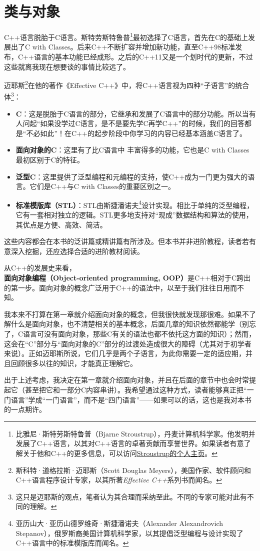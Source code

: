 \section{类与对象}
C++语言脱胎于C语言。斯特劳斯特鲁普\footnote{比雅尼·斯特劳斯特鲁普（Bjarne Stroustrup），丹麦计算机科学家。他发明并发展了C++语言，以其对C++语言的卓著贡献而享誉世界。如果读者有意了解关于他和C++的更多信息，可以访问\href{https://www.stroustrup.com/}{Stroustrup的个人主页}。}最初选择了C语言，首先在C的基础上发展出了C with Classes。后来C++不断扩容并增加新功能，直至C++98标准发布，C++语言的基本功能已经成形。之后的C++11又是一个划时代的更新，不过这些就离我现在想要谈的事情比较远了。\par
迈耶斯\footnote{斯科特·道格拉斯·迈耶斯（Scott Douglas Meyers），美国作家、软件顾问和C++语言程序设计专家，以其所著\textit{Effective C++}系列书而闻名。}在他的著作《Effective C++》中，将C++语言视为四种``子语言''的统合体\footnote{这只是迈耶斯的观点，笔者认为其合理而采纳至此。不同的专家可能对此有不同的理解。}：
\begin{itemize}
    \item \textbf{C}：这是脱胎于C语言的部分，它继承和发展了C语言中的部分功能。所以当有人问起``如果没学过C语言，是不是要先学C再学C++''的时候，我们的回答都是``不必如此''！在C++的起步阶段中你学习的内容已经基本涵盖C语言了。
    \item \textbf{面向对象的C}：这里有了比C语言中 \lstinline@struct@ 丰富得多的功能，它也是C with Classes最初区别于C的特征。
    \item \textbf{泛型C}：这里提供了泛型编程和元编程的支持，使C++成为一门更为强大的语言。它们是C++与C with Classes的重要区别之一。
    \item \textbf{标准模版库（STL）}：STL由斯捷潘诺夫\footnote{亚历山大·亚历山德罗维奇·斯捷潘诺夫（Alexander Alexandrovich Stepanov），俄罗斯裔美国计算机科学家，以其提倡泛型编程与设计实现了C++语言中的标准模版库而闻名。}设计实现。相比于单纯的泛型编程，它有一套相对独立的逻辑。STL更多地支持对``现成''数据结构和算法的使用，其优点是方便、高效、简洁。
\end{itemize}
这些内容都会在本书的泛讲篇或精讲篇有所涉及。但本书并非进阶教程，读者若有意深入挖掘，还应选择合适的进阶教材阅读。\par
从C++的发展史来看，\textbf{面向对象编程（Object-oriented programming, OOP）}是C++相对于C跨出的第一步。面向对象的概念广泛用于C++的语法中，以至于我们往往日用而不知。\par
我本来不打算在第一章就介绍面向对象的概念，但我很快就发现那很难。如果不了解什么是面向对象，也不清楚相关的基本概念，后面几章的知识依然都能学（别忘了，C语言可没有面向对象，那些C有关的语法也都不依托这方面的知识）；然而，这会在``C''部分与``面向对象的C''部分的过渡处造成很大的障碍（尤其对于初学者来说）。正如迈耶斯所说，它们几乎是两个子语言，为此你需要一定的适应期，并且回顾很多以往的知识，才能真正理解它。\par
出于上述考虑，我决定在第一章就介绍面向对象，并且在后面的章节中也会时常提起它（甚至把它和一部分C内容串讲）。我希望通过这种方式，读者能够真正把``一门语言''学成``一门语言''，而不是``四门语言''——如果可以的话，这也是我对本书的一点期许。\par
